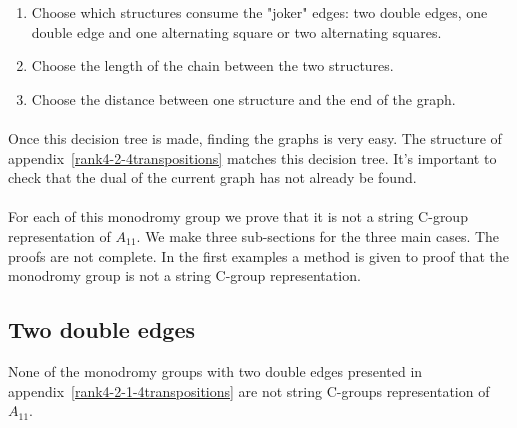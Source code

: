 \begin{enumerate}
  \item Choose which structures consume the "joker" edges: two double edges, one double edge and one alternating square or two alternating squares.
  \item Choose the length of the chain between the two structures.
  \item Choose the distance between one structure and the end of the graph.
\end{enumerate}

\paragraph{}
Once this decision tree is made, finding the graphs is very easy. The structure of appendix~\ref{rank4-2-4transpositions} matches this decision tree. It's important to check that the dual of the current graph has not already be found.

\paragraph{}
For each of this monodromy group we prove that it is not a string C-group representation of $A_{11}$. We make three sub-sections for the three main cases. The proofs are not complete. In the first examples a method is given to proof that the monodromy group is not a string C-group representation.

\subsection{Two double edges}

\begin{theorem}
  None of the monodromy groups with two double edges presented in appendix~\ref{rank4-2-1-4transpositions} are not string C-groups representation of $A_{11}$.
\end{theorem}

